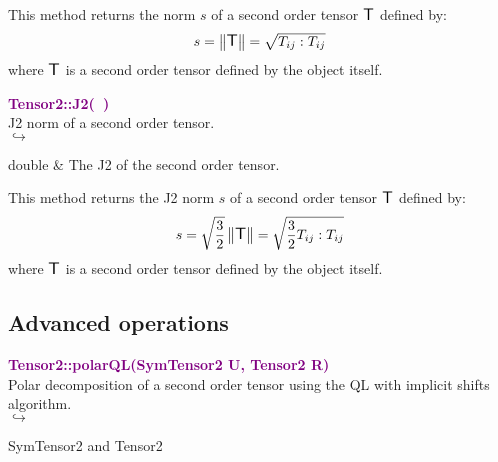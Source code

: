 This method returns the norm $s$ of a second order tensor $\mbox{\large\ensuremath{\mathsf{T}}}$ defined by:\begin{equation*}
s = \left\Vert \mbox{\large\ensuremath{\mathsf{T}}} \right\Vert  = \sqrt {T_{ij}:T_{ij}}
\end{equation*}
where $\mbox{\large\ensuremath{\mathsf{T}}}$ is a second order tensor defined by the object itself.

\textcolor{purple}{\textbf{Tensor2::J2(~)}}\label{Tensor2::J2()}\\
J2 norm of a second order tensor.\\ \hspace*{5mm}$\hookrightarrow$
\vspace*{-2em}\begin{tcolorbox}[grow to left by=-1cm, width=\textwidth-1cm,myArgs,tabularx={l|R}]
double & The J2 of the second order tensor.
\end{tcolorbox}

This method returns the J2 norm $s$ of a second order tensor $\mbox{\large\ensuremath{\mathsf{T}}}$ defined by:
\begin{equation*}
s = \sqrt {\frac{3}{2}} \left\Vert \mbox{\large\ensuremath{\mathsf{T}}} \right\Vert  = \sqrt {\frac{3}{2} T_{ij}:T_{ij}}
\end{equation*}
where $\mbox{\large\ensuremath{\mathsf{T}}}$ is a second order tensor defined by the object itself.

\subsection{Advanced operations}

\textcolor{purple}{\textbf{Tensor2::polarQL(SymTensor2 U, Tensor2 R)}}\label{Tensor2::polarQL(SymTensor2 U, Tensor2 R)}\\
Polar decomposition of a second order tensor using the QL with implicit shifts algorithm.\\ \hspace*{5mm}$\hookrightarrow$
\vspace*{-2em}\begin{tcolorbox}[grow to left by=-1cm, width=\textwidth-1cm,myArgs,tabularx={l|R}]
SymTensor2 and Tensor2
\end{tcolorbox}

